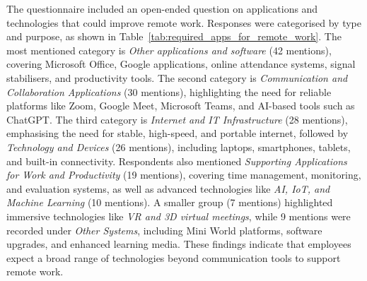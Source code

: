 \documentclass[conference]{IEEEtran}
\begin{document}
The questionnaire included an open-ended question on applications and technologies that could improve remote work. Responses were categorised by type and purpose, as shown in Table~\ref{tab:required_apps_for_remote_work}. The most mentioned category is \textit{Other applications and software} (42 mentions), covering Microsoft Office, Google applications, online attendance systems, signal stabilisers, and productivity tools. The second category is \textit{Communication and Collaboration Applications} (30 mentions), highlighting the need for reliable platforms like Zoom, Google Meet, Microsoft Teams, and AI-based tools such as ChatGPT. The third category is \textit{Internet and IT Infrastructure} (28 mentions), emphasising the need for stable, high-speed, and portable internet, followed by \textit{Technology and Devices} (26 mentions), including laptops, smartphones, tablets, and built-in connectivity. Respondents also mentioned \textit{Supporting Applications for Work and Productivity} (19 mentions), covering time management, monitoring, and evaluation systems, as well as advanced technologies like \textit{AI, IoT, and Machine Learning} (10 mentions). A smaller group (7 mentions) highlighted immersive technologies like \textit{VR and 3D virtual meetings}, while 9 mentions were recorded under \textit{Other Systems}, including Mini World platforms, software upgrades, and enhanced learning media. These findings indicate that employees expect a broad range of technologies beyond communication tools to support remote work.
\end{document}
